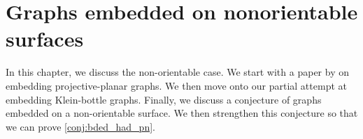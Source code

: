 \chapter{Graphs embedded on nonorientable surfaces}\label{chap:nonorientable}

In this chapter, we discuss the non-orientable case. We start with a paper by \textcite{nakamotoBookEmbeddingProjectiveplanar2015} on embedding projective-planar graphs. We then move onto our partial attempt at embedding Klein-bottle graphs. Finally, we discuss a conjecture of graphs embedded on a non-orientable surface. We then strengthen this conjecture so that we can prove \cref{conj:bded_had_pn}. 







